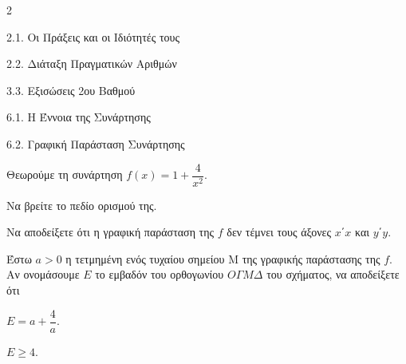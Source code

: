 \begin{ylh}{2}
    \item 2.1. Οι Πράξεις και οι Ιδιότητές τους
    \item 2.2. Διάταξη Πραγματικών Αριθμών
    \item 3.3. Εξισώσεις 2ου Βαθμού
    \item 6.1. Η Έννοια της Συνάρτησης
    \item 6.2. Γραφική Παράσταση Συνάρτησης
\end{ylh}
Θεωρούμε τη συνάρτηση $f(x) = 1 + \dfrac{4}{x^{2}}$.
\begin{alist}
\item Να βρείτε το πεδίο ορισμού της.
\item Να αποδείξετε ότι η γραφική παράσταση της $f$ δεν τέμνει τους άξονες $x΄x$ και $y΄y$.
\item Έστω $a > 0$ η τετμημένη ενός τυχαίου σημείου Μ της γραφικής παράστασης της $f$. Αν ονομάσουμε $E$ το εμβαδόν του ορθογωνίου $O\Gamma M\Delta$ του σχήματος, να αποδείξετε ότι
\begin{rlist}
\item
  $E = a + \dfrac{4}{a}$.
\item
  $E \geq 4$.
\end{rlist}
\end{alist}

